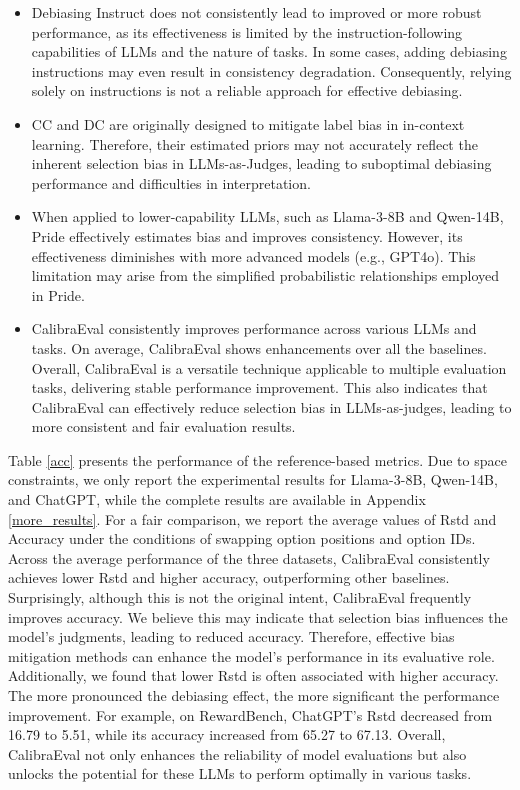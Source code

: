 \documentclass[sigconf]{acmart}
\begin{document}
\begin{itemize}[leftmargin=*]
    \item Debiasing Instruct does not consistently lead to improved or more robust performance, as its effectiveness is limited by the instruction-following capabilities of LLMs and the nature of tasks. In some cases, adding debiasing instructions may even result in consistency degradation. Consequently, relying solely on instructions is not a reliable approach for effective debiasing.
    \item CC and DC are originally designed to mitigate label bias in in-context learning. Therefore, their estimated priors may not accurately reflect the inherent selection bias in LLMs-as-Judges, leading to suboptimal debiasing performance and difficulties in interpretation.
    \item When applied to lower-capability LLMs, such as Llama-3-8B and Qwen-14B, Pride effectively estimates bias and improves consistency. However, its effectiveness diminishes with more advanced models (e.g., GPT4o). This limitation may arise from the simplified probabilistic relationships employed in Pride.        
    \item CalibraEval consistently improves performance across various LLMs and tasks. On average, CalibraEval shows enhancements over all the baselines. 
    Overall, CalibraEval is a versatile technique applicable to multiple evaluation tasks, delivering stable performance improvement.
    This also indicates that CalibraEval can effectively reduce selection bias in LLMs-as-judges, leading to more consistent and fair evaluation results.    
\end{itemize}

Table \ref{acc} presents the performance of the reference-based metrics.
Due to space constraints, we only report the experimental results for Llama-3-8B, Qwen-14B, and ChatGPT, while the complete results are available in Appendix \ref{more_results}. 
For a fair comparison, we report the average values of Rstd and Accuracy under the conditions of swapping option positions and option IDs.
Across the average performance of the three datasets, CalibraEval consistently achieves lower Rstd and higher accuracy, outperforming other baselines.
Surprisingly, although this is not the original intent, CalibraEval frequently improves accuracy.
We believe this may indicate that selection bias influences the model's judgments, leading to reduced accuracy. Therefore, effective bias mitigation methods can enhance the model's performance in its evaluative role.
Additionally, we found that lower Rstd is often associated with higher accuracy. The more pronounced the debiasing effect, the more significant the performance improvement. For example, on RewardBench, ChatGPT's Rstd decreased from 16.79 to 5.51, while its accuracy increased from 65.27 to 67.13. Overall, CalibraEval not only enhances the reliability of model evaluations but also unlocks the potential for these LLMs to perform optimally in various tasks.
\end{document}
